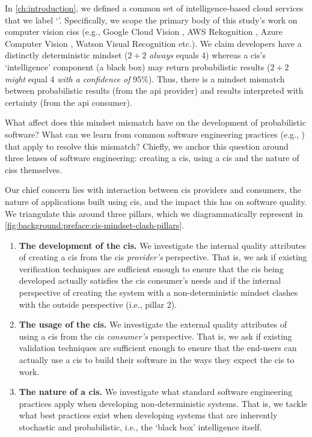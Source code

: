 \label{sec:background:preface}

In \cref{ch:introduction}, we defined a common set of intelligence-based cloud services that we label `'. Specifically, we scope the primary body of this study's work on computer vision \glspl{cis} (e.g., Google Cloud Vision \citep{GoogleCloud:Home}, AWS Rekognition \citep{AWS:Home}, Azure Computer Vision \citep{Azure:Home}, Watson Visual Recognition \citep{IBM:Home} etc.). We claim developers have a distinctly deterministic mindset ($2+2$ \textit{always}  equals 4) whereas a \gls{cis}'s `intelligence' component (a black box) may return probabilistic results ($2+2$ \textit{might} equal 4 \textit{with a confidence of} 95\%). Thus, there is a mindset mismatch between probabilistic results (from the \gls{api} provider) and results interpreted with certainty (from the \gls{api} consumer).

What affect does this mindset mismatch have on the development of probabilistic software? What can we learn from common software engineering practices (e.g., \citep{Pressman:2005vf,Sommerville:2011uc}) that apply to resolve this mismatch? Chiefly, we anchor this question around three lenses of software engineering: creating a \gls{cis}, using a \gls{cis} and the nature of \glspl{cis} themselves.

Our chief concern lies with interaction between \gls{cis} providers and consumers, the nature of applications built using \gls{cis}, and the impact this has on software quality. We triangulate this around three pillars, which we diagrammatically represent in \cref{fig:background:preface:cis-mindset-clash-pillars}.
 
\begin{enumerate}[label=\textbf{\arabic*}.]
\item \textbf{The development of the \gls{cis}.} We investigate the internal quality attributes of creating a \gls{cis} from the \gls{cis} \textit{provider's} perspective. That is, we ask if existing verification techniques are sufficient enough to ensure that the \gls{cis} being developed actually satisfies the \gls{cis} consumer's needs and if the internal perspective of creating the system with a non-deterministic mindset clashes with the outside perspective (i.e., pillar 2).
\item \textbf{The usage of the \gls{cis}.} We investigate the external quality attributes of using a \gls{cis} from the \gls{cis} \textit{consumer's} perspective. That is, we ask if existing validation techniques are sufficient enough to ensure that the end-users can actually use a \gls{cis} to build their software in the ways they expect the \gls{cis} to work.
\item \textbf{The nature of a \gls{cis}.} We investigate what standard software engineering practices apply when developing non-deterministic systems. That is, we tackle what best practices exist when developing systems that are inherently stochastic and probabilistic, i.e., the `black box' intelligence itself.
\end{enumerate}

